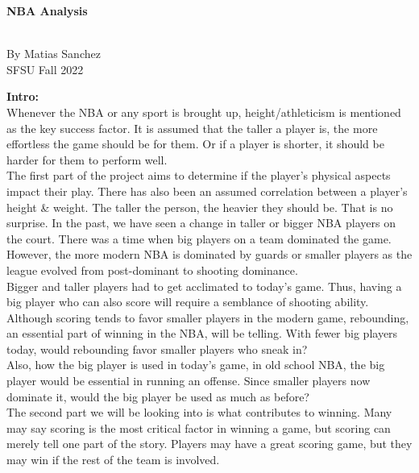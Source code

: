 \documentclass[11pt,letterpaper]{amsart}
\begin{document}
\begin{center}

\begin{LARGE}
\textbf{NBA Analysis}
\end{LARGE}\\
By Matias Sanchez\\
SFSU Fall 2022

\end{center}

\noindent \Large \textbf{Intro:} \leavevmode \newline\\

\indent Whenever the NBA or any sport is brought up, height/athleticism is mentioned as the key success factor. It is assumed that the taller a player is, the more effortless the game should be for them. Or if a player is shorter, it should be harder for them to perform well.\\

\indent The first part of the project aims to determine if the player’s physical aspects impact their play. There has also been an assumed correlation between a player’s height \& weight. The taller the person, the heavier they should be. That is no surprise. In the past, we have seen a change in taller or bigger NBA players on the court. There was a time when big players on a team dominated the game. However, the more modern NBA is dominated by guards or smaller players as the league evolved from post-dominant to shooting dominance.\\

\noindent Bigger and taller players had to get acclimated to today’s game. Thus, having a big player who can also score will require a semblance of shooting ability.\\

\noindent Although scoring tends to favor smaller players in the modern game, rebounding, an essential part of winning in the NBA, will be telling.  With fewer big players today, would rebounding favor smaller players who sneak in?\\ 

\noindent Also, how the big player is used in today’s game, in old school NBA, the big player would be essential in running an offense. Since smaller players now dominate it, would the big player be used as much as before?\\

\indent The second part we will be looking into is what contributes to winning. Many may say scoring is the most critical factor in winning a game, but scoring can merely tell one part of the story. Players may have a great scoring game, but they may win if the rest of the team is involved.\\
\end{document}
